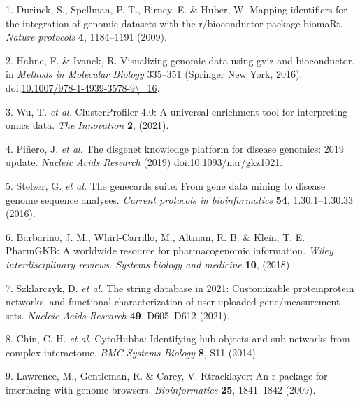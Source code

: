 \documentclass[
]{article}
\newenvironment{cslreferences}%
  {}%
  {\par}
\begin{document}
\hypertarget{refs}{}
\begin{cslreferences}
\leavevmode\hypertarget{ref-MappingIdentifDurinc2009}{}%
1. Durinck, S., Spellman, P. T., Birney, E. \& Huber, W. Mapping identifiers for the integration of genomic datasets with the r/bioconductor package biomaRt. \emph{Nature protocols} \textbf{4}, 1184--1191 (2009).

\leavevmode\hypertarget{ref-VisualizingGenHahne2016}{}%
2. Hahne, F. \& Ivanek, R. Visualizing genomic data using gviz and bioconductor. in \emph{Methods in Molecular Biology} 335--351 (Springer New York, 2016). doi:\href{https://doi.org/10.1007/978-1-4939-3578-9/_16}{10.1007/978-1-4939-3578-9\textbackslash\_16}.

\leavevmode\hypertarget{ref-ClusterprofilerWuTi2021}{}%
3. Wu, T. \emph{et al.} ClusterProfiler 4.0: A universal enrichment tool for interpreting omics data. \emph{The Innovation} \textbf{2}, (2021).

\leavevmode\hypertarget{ref-TheDisgenetKnPinero2019}{}%
4. Piñero, J. \emph{et al.} The disgenet knowledge platform for disease genomics: 2019 update. \emph{Nucleic Acids Research} (2019) doi:\href{https://doi.org/10.1093/nar/gkz1021}{10.1093/nar/gkz1021}.

\leavevmode\hypertarget{ref-TheGenecardsSStelze2016}{}%
5. Stelzer, G. \emph{et al.} The genecards suite: From gene data mining to disease genome sequence analyses. \emph{Current protocols in bioinformatics} \textbf{54}, 1.30.1--1.30.33 (2016).

\leavevmode\hypertarget{ref-PharmgkbAWorBarbar2018}{}%
6. Barbarino, J. M., Whirl-Carrillo, M., Altman, R. B. \& Klein, T. E. PharmGKB: A worldwide resource for pharmacogenomic information. \emph{Wiley interdisciplinary reviews. Systems biology and medicine} \textbf{10}, (2018).

\leavevmode\hypertarget{ref-TheStringDataSzklar2021}{}%
7. Szklarczyk, D. \emph{et al.} The string database in 2021: Customizable proteinprotein networks, and functional characterization of user-uploaded gene/measurement sets. \emph{Nucleic Acids Research} \textbf{49}, D605--D612 (2021).

\leavevmode\hypertarget{ref-CytohubbaIdenChin2014}{}%
8. Chin, C.-H. \emph{et al.} CytoHubba: Identifying hub objects and sub-networks from complex interactome. \emph{BMC Systems Biology} \textbf{8}, S11 (2014).

\leavevmode\hypertarget{ref-RtracklayerAnLawren2009}{}%
9. Lawrence, M., Gentleman, R. \& Carey, V. Rtracklayer: An r package for interfacing with genome browsers. \emph{Bioinformatics} \textbf{25}, 1841--1842 (2009).


\end{cslreferences}
\end{document}
